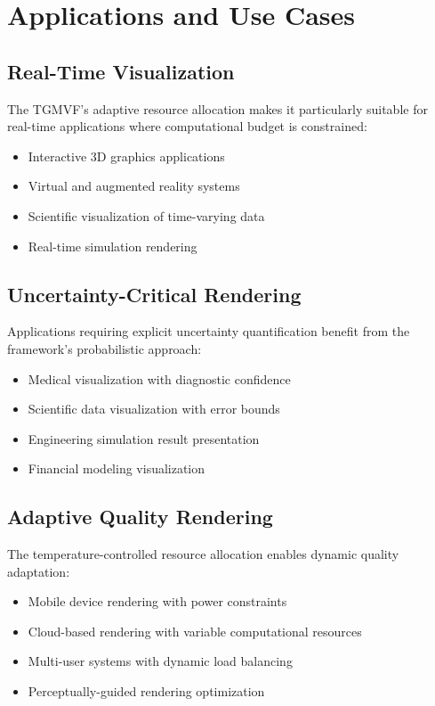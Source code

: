 \documentclass[12pt,a4paper]{article}
\begin{document}
\section{Applications and Use Cases}

\subsection{Real-Time Visualization}

The TGMVF's adaptive resource allocation makes it particularly suitable for real-time applications where computational budget is constrained:

\begin{itemize}
\item Interactive 3D graphics applications
\item Virtual and augmented reality systems
\item Scientific visualization of time-varying data
\item Real-time simulation rendering
\end{itemize}

\subsection{Uncertainty-Critical Rendering}

Applications requiring explicit uncertainty quantification benefit from the framework's probabilistic approach:

\begin{itemize}
\item Medical visualization with diagnostic confidence
\item Scientific data visualization with error bounds
\item Engineering simulation result presentation
\item Financial modeling visualization
\end{itemize}

\subsection{Adaptive Quality Rendering}

The temperature-controlled resource allocation enables dynamic quality adaptation:

\begin{itemize}
\item Mobile device rendering with power constraints
\item Cloud-based rendering with variable computational resources
\item Multi-user systems with dynamic load balancing
\item Perceptually-guided rendering optimization
\end{itemize}
\end{document}
